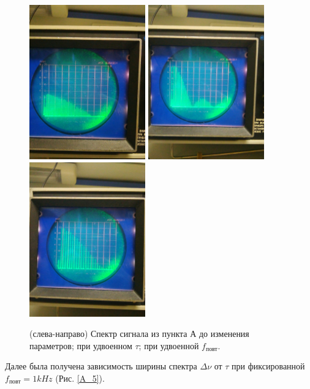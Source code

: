 \documentclass[a4paper,12pt]{article}
\begin{document}
\begin{figure}[htpb]
\centering
\includegraphics[width=50mm]{Pictures/A2-0.jpg}
\includegraphics[width=50mm]{Pictures/A2-a.jpg}
\includegraphics[width=50mm]{Pictures/A2-b.jpg}
\caption{(слева-направо) Спектр сигнала из пункта А до изменения параметров; при удвоенном $\tau$; при удвоенной $f_\text{повт}$.}
\label{A_2}
\end{figure}

Далее была получена зависимость ширины спектра $\Delta \nu$ от $\tau$ при фиксированной $f_\text{повт} = 1 kHz$ (Рис. \ref{A_5}).
\end{document}
